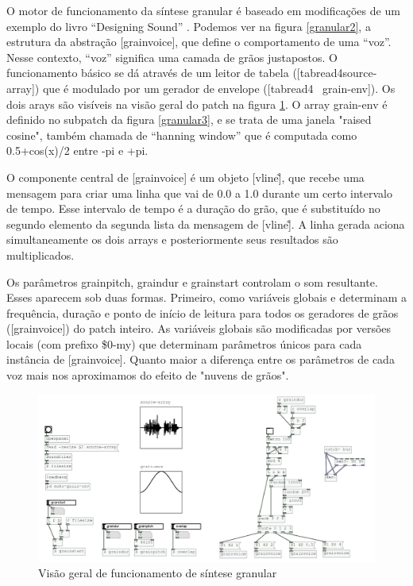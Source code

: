 \documentclass{ppgmus}
\begin{document}
O motor de funcionamento da síntese granular é baseado em modificações de um exemplo
do livro ``Designing Sound'' \cite{farnell2010designing}. Podemos ver na figura \ref{granular2}, a estrutura
da abstração [grainvoice], que define o comportamento de uma ``voz''. Nesse contexto,
``voz'' significa uma camada de grãos justapostos. O funcionamento básico se dá através
de um leitor de tabela ([tabread4\texttildelow source-array]) que é modulado por um gerador de envelope ([tabread4~ grain-env]).
Os dois arays são visíveis na visão geral do patch na figura \ref{granular-geral}. O array grain-env
é definido no subpatch da figura \ref{granular3}, e se trata de uma janela "raised cosine", também
chamada de ``hanning window'' que é computada como 0.5+cos(x)/2 entre -pi e +pi.

O componente central de [grainvoice] é um objeto [vline\~], que recebe uma mensagem para criar uma linha que 
vai de 0.0 a 1.0 durante um certo intervalo de tempo. Esse intervalo de tempo é a duração
do grão, que é substituído no segundo elemento da segunda lista da mensagem de [vline\~].
A linha gerada aciona simultaneamente os dois arrays e posteriormente 
seus resultados são multiplicados.

Os parâmetros grainpitch, graindur e grainstart controlam o som resultante. Esses aparecem sob duas
formas. Primeiro, como variáveis globais e determinam a frequência, duração e ponto de início de leitura para
todos os geradores de grãos ([grainvoice]) do patch inteiro. As variáveis globais são modificadas
por versões locais (com prefixo \$0-my) que determinam parâmetros únicos para cada instância de [grainvoice].
Quanto maior a diferença entre os parâmetros de cada voz mais nos aproximamos do efeito de "nuvens de grãos".

\begin{figure}
\includegraphics[scale=.6]{granular-geral}
\caption{Visão geral de funcionamento de síntese granular}
\label{granular-geral}
\end{figure}
\end{document}
